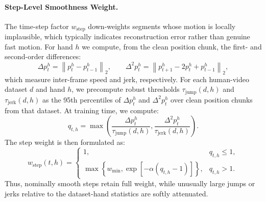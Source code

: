 
\paragraph{Step-Level Smoothness Weight.}
The time-step factor $w_{\mathrm{step}}$ down-weights segments whose motion is locally implausible, which typically indicates reconstruction error rather than genuine fast motion. For hand $h$ we compute, from the clean position chunk, the first- and second-order differences:
\begin{equation}
\Delta p_t^{h} = \left\|p_t^{h} - p_{t-1}^{h}\right\|_2,
\qquad
\Delta^2 p_t^{h} =
\left\|p_{t+1}^{h} - 2p_t^{h} + p_{t-1}^{h}\right\|_2,
\end{equation}
which measure inter-frame speed and jerk, respectively. For each human-video dataset $d$ and hand $h$, we precompute robust thresholds $\tau_{\mathrm{jump}}(d,h)$ and $\tau_{\mathrm{jerk}}(d,h)$ as the 95th percentiles of $\Delta p_t^h$ and $\Delta^2 p_t^h$ over clean position chunks from that dataset. At training time, we compute:
\begin{equation}
q_{t,h}
=
\max\!\left(
\frac{\Delta p_t^h}{\tau_{\mathrm{jump}}(d,h)},
\frac{\Delta^2 p_t^h}{\tau_{\mathrm{jerk}}(d,h)}
\right).
\end{equation}
The step weight is then formulated as:
\begin{equation}
w_{\mathrm{step}}(t,h)
=
\begin{cases}
1, & q_{t,h} \le 1,\\
\max\!\left\{w_{\min}, \exp[-\alpha(q_{t,h}-1)]\right\}, & q_{t,h} > 1.
\end{cases}
\end{equation}
Thus, nominally smooth steps retain full weight, while unusually large jumps or jerks relative to the dataset-hand statistics are softly attenuated.


